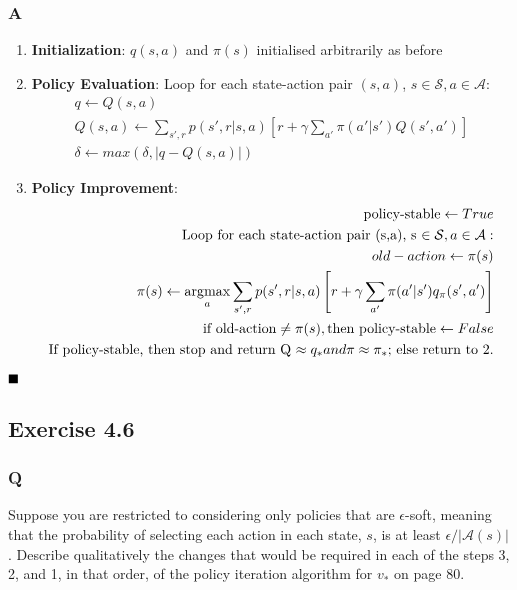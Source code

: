\subsubsection{A}
\begin{enumerate}
	\item \textbf{Initialization}: $q(s,a)$ and $\pi(s)$ initialised arbitrarily as before
	\item \textbf{Policy Evaluation}: Loop for each state-action pair $(s,a)$, $s \in \mathcal{S}, a \in \mathcal{A}$:\\
	\begin{equation}
	\begin{aligned}
		q \leftarrow Q(s,a) \\
		Q(s,a) \leftarrow \sum_{s',r} p(s', r | s, a) \left[r + \gamma \sum_{a'} \pi(a' | s') Q(s', a')\right] \\
		\delta \leftarrow max(\delta, |q - Q(s,a)|)
	\end{aligned}
	\end{equation}
	\item \textbf{Policy Improvement}: \\
	\begin{equation}
	\begin{aligned}
		\text{policy-stable} \leftarrow True \\
		\text{Loop for each state-action pair (s,a), s $\in \mathcal{S}, a \in \mathcal{A}$}:\\
		old-action \leftarrow \pi(s)\\
		\pi(s) \leftarrow \operatorname*{\arg\!\max}_a \sum_{s',r} p(s', r | s, a) \left[r + \gamma \sum_{a'} \pi(a' | s') q_\pi(s', a')\right] \\
		\text{if old-action} \neq \pi(s), \text{then policy-stable} \leftarrow False \\
		\text{If policy-stable, then stop and return Q $\approx q_* and \pi \approx \pi_*$; else return to 2.} \\
	\end{aligned}
	\end{equation}
\end{enumerate}
$
\hfill \blacksquare
$

\subsection{Exercise 4.6}
\subsubsection{Q}
Suppose you are restricted to considering only policies that are $\epsilon$-soft, meaning that the probability of selecting each action in each state, $s$, is at least $\epsilon /|\mathcal{A}(s)|$. Describe qualitatively the changes that would be required in each of the steps 3, 2, and 1, in that order, of the policy iteration algorithm for $v_*$ on page 80.

